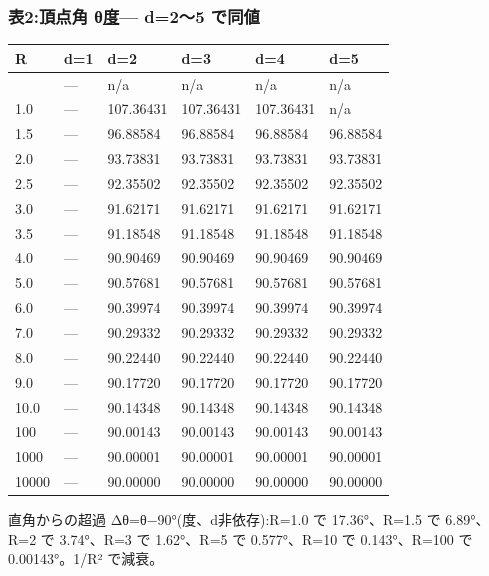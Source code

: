 \documentclass[
]{ltjsarticle}
\newcounter{none} %
\begin{document}
\subsubsection{\texorpdfstring{表2:頂点角 θ\href{直角=90°の歪み}{度}---
d=2〜5
で同値}{表2:頂点角 θ度--- d=2〜5 で同値}}\label{ux88682ux9802ux70b9ux89d2-ux3b8ux5ea6-d25-ux3067ux540cux5024}

{\def\LTcaptype{none} %
\begin{longtable}[]{@{}llllll@{}}
\toprule\noalign{}
R & d=1 & d=2 & d=3 & d=4 & d=5 \\
\midrule\noalign{}
\endhead
\bottomrule\noalign{}
\endlastfoot
0.5 & --- & n/a & n/a & n/a & n/a \\
1.0 & --- & 107.36431 & 107.36431 & 107.36431 & n/a \\
1.5 & --- & 96.88584 & 96.88584 & 96.88584 & 96.88584 \\
2.0 & --- & 93.73831 & 93.73831 & 93.73831 & 93.73831 \\
2.5 & --- & 92.35502 & 92.35502 & 92.35502 & 92.35502 \\
3.0 & --- & 91.62171 & 91.62171 & 91.62171 & 91.62171 \\
3.5 & --- & 91.18548 & 91.18548 & 91.18548 & 91.18548 \\
4.0 & --- & 90.90469 & 90.90469 & 90.90469 & 90.90469 \\
5.0 & --- & 90.57681 & 90.57681 & 90.57681 & 90.57681 \\
6.0 & --- & 90.39974 & 90.39974 & 90.39974 & 90.39974 \\
7.0 & --- & 90.29332 & 90.29332 & 90.29332 & 90.29332 \\
8.0 & --- & 90.22440 & 90.22440 & 90.22440 & 90.22440 \\
9.0 & --- & 90.17720 & 90.17720 & 90.17720 & 90.17720 \\
10.0 & --- & 90.14348 & 90.14348 & 90.14348 & 90.14348 \\
100 & --- & 90.00143 & 90.00143 & 90.00143 & 90.00143 \\
1000 & --- & 90.00001 & 90.00001 & 90.00001 & 90.00001 \\
10000 & --- & 90.00000 & 90.00000 & 90.00000 & 90.00000 \\
\end{longtable}
}

直角からの超過 Δθ=θ−90°(度、d非依存):R=1.0 で 17.36°、R=1.5 で
6.89°、R=2 で 3.74°、R=3 で 1.62°、R=5 で 0.577°、R=10 で 0.143°、R=100
で 0.00143°。1/R² で減衰。
\end{document}

